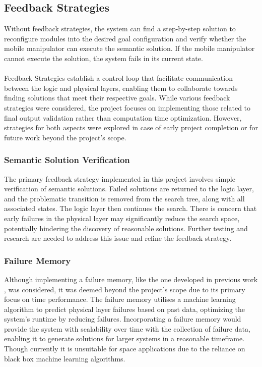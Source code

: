 \subsection{Feedback Strategies}
Without feedback strategies, the system can find a step-by-step solution to reconfigure modules into the desired goal configuration and verify whether the mobile manipulator can execute the semantic solution. If the mobile manipulator cannot execute the solution, the system fails in its current state.
\\\\
Feedback Strategies establish a control loop that facilitate communication between the logic and physical layers, enabling them to collaborate towards finding solutions that meet their respective goals. While various feedback strategies were considered, the project focuses on implementing those related to final output validation rather than computation time optimization. However, strategies for both aspects were explored in case of early project completion or for future work beyond the project's scope.

\subsubsection{Semantic Solution Verification}
The primary feedback strategy implemented in this project involves simple verification of semantic solutions. Failed solutions are returned to the logic layer, and the problematic transition is removed from the search tree, along with all associated states. The logic layer then continues the search. There is concern that early failures in the physical layer may significantly reduce the search space, potentially hindering the discovery of reasonable solutions. Further testing and research are needed to address this issue and refine the feedback strategy.

\subsubsection{Failure Memory}
Although implementing a failure memory, like the one developed in previous work \cite{9438257}, was considered, it was deemed beyond the project's scope due to its primary focus on time performance. The failure memory utilises a machine learning algorithm to predict physical layer failures based on past data, optimizing the system's runtime by reducing failures. Incorporating a failure memory would provide the system with scalability over time with the collection of failure data, enabling it to generate solutions for larger systems in a reasonable timeframe. Though currently it is unsuitable for space applications due to the reliance on black box machine learning algorithms.  